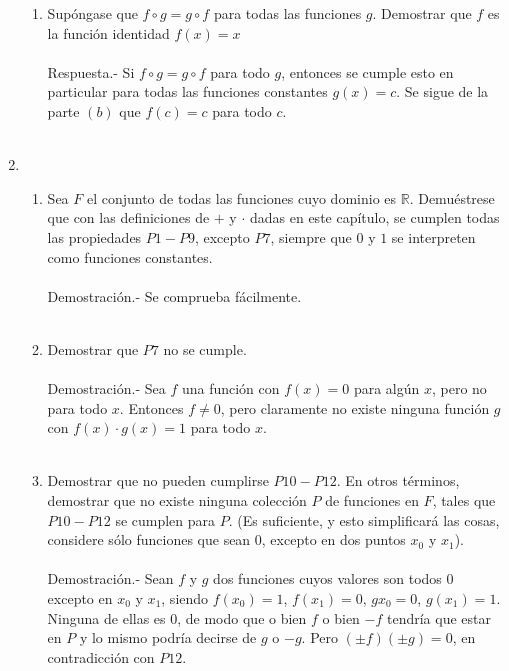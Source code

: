 \begin{enumerate}
\begin{enumerate}[\bfseries (a)]
		\item Supóngase que $f\circ g = g\circ f$ para todas las funciones $g$. Demostrar que $f$ es la función identidad $f(x)=x$\\\\
		    Respuesta.-\; Si $f\circ g = g  \circ f$ para todo $g$, entonces se cumple esto en particular para todas las funciones constantes $g(x)=c$. Se sigue de la parte $(b)$ que $f(c)=c$ para todo $c.$\\\\

	    \end{enumerate}

	\item
	\begin{enumerate}[\bfseries (a)]

	    \item Sea $F$ el conjunto de todas las funciones cuyo dominio es $\mathbb{R}$. Demuéstrese que con las definiciones de $+$ y $\cdot $ dadas en este capítulo, se cumplen todas las propiedades $P1-P9$, excepto $P7$, siempre que $0$ y $1$ se interpreten como funciones constantes.\\\\
	    Demostración.-\; Se comprueba fácilmente.\\\\

	    \item Demostrar que $P7$ no se cumple.\\\\
		Demostración.-\; Sea $f$ una función con $f(x)=0$ para algún $x$, pero no para todo $x$. Entonces $f\neq 0$, pero claramente no existe ninguna función $g$ con $f(x)\cdot g(x) = 1$ para todo $x$.\\\\

	    \item Demostrar que no pueden cumplirse $P10-P12.$ En otros términos, demostrar que no existe ninguna colección $P$ de funciones en $F$, tales que $P10-P12$ se cumplen para $P$. (Es suficiente, y esto simplificará las cosas, considere sólo funciones que sean $0$, excepto en dos puntos $x_0$ y $x_1$).\\\\
		Demostración.-\; Sean $f$ y $g$ dos funciones cuyos valores son todos $0$ excepto en $x_0$ y $x_1$, siendo $f(x_0)=1$, $f(x_1)=0$, $gx_0 = 0$, $g(x_1)=1.$ Ninguna de ellas es $0$, de modo que o bien $f$ o bien $-f$ tendría que estar en $P$ y lo mismo podría decirse de $g$ o $-g$. Pero $(\pm f)(\pm g) = 0$, en contradicción con $P12$.\\\\


\end{enumerate}
\end{enumerate}

